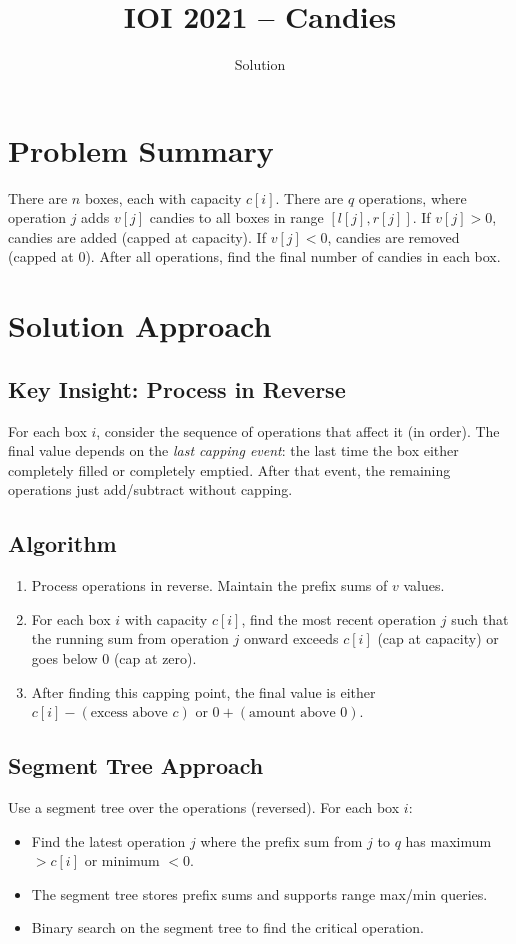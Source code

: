 \documentclass[11pt,a4paper]{article}
\title{IOI 2021 -- Candies}
\author{Solution}
\date{}
\begin{document}
\maketitle

\section{Problem Summary}
There are $n$ boxes, each with capacity $c[i]$. There are $q$ operations, where operation $j$ adds $v[j]$ candies to all boxes in range $[l[j], r[j]]$. If $v[j] > 0$, candies are added (capped at capacity). If $v[j] < 0$, candies are removed (capped at 0). After all operations, find the final number of candies in each box.

\section{Solution Approach}

\subsection{Key Insight: Process in Reverse}
For each box $i$, consider the sequence of operations that affect it (in order). The final value depends on the \emph{last capping event}: the last time the box either completely filled or completely emptied. After that event, the remaining operations just add/subtract without capping.

\subsection{Algorithm}
\begin{enumerate}
  \item Process operations in reverse. Maintain the prefix sums of $v$ values.
  \item For each box $i$ with capacity $c[i]$, find the most recent operation $j$ such that the running sum from operation $j$ onward exceeds $c[i]$ (cap at capacity) or goes below $0$ (cap at zero).
  \item After finding this capping point, the final value is either $c[i] - (\text{excess above } c)$ or $0 + (\text{amount above } 0)$.
\end{enumerate}

\subsection{Segment Tree Approach}
Use a segment tree over the operations (reversed). For each box $i$:
\begin{itemize}
  \item Find the latest operation $j$ where the prefix sum from $j$ to $q$ has maximum $> c[i]$ or minimum $< 0$.
  \item The segment tree stores prefix sums and supports range max/min queries.
  \item Binary search on the segment tree to find the critical operation.
\end{itemize}
\end{document}
